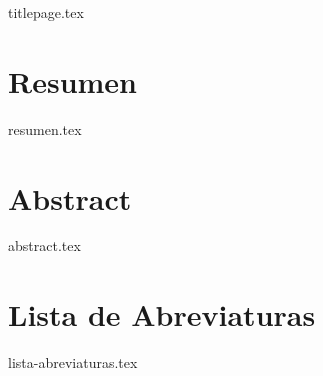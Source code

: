 \documentclass[twoside,openright,11pt]{report}
\begin{document}
\renewcommand{\figurename}{Imagen}
\renewcommand{\listfigurename}{Lista de Imágenes}




\thispagestyle{empty}
{titlepage.tex}

\newpage






\chapter*{Resumen}

{resumen.tex}


\chapter*{Abstract}

{abstract.tex}


\tableofcontents
\setcounter{page}{1}
\thispagestyle{plain}



\chapter*{Lista de Abreviaturas}

{lista-abreviaturas.tex}

\listoffigures
\thispagestyle{plain}
\end{document}
